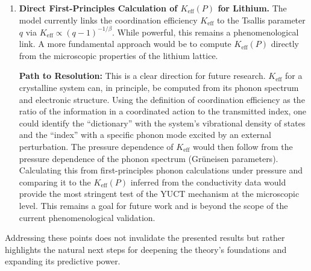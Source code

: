 \documentclass[12pt,a4paper]{article}
\theoremstyle{remark}
\newcommand{\Ke}{K_{\mathrm{eff}}}
\begin{document}
\begin{enumerate}
		\textbf{Path to Resolution:} This point can be clarified by stating that \(q(P)\) is not a free parameter of YUCT, but an input derived from the well-established physics of lithium under pressure. It is determined by the pressure-dependent electronic density of states and the resulting modification to the non-extensivity parameter. This relationship, \(q(P)\), is independently calculable using Density Functional Theory (DFT) and is therefore not a prediction of YUCT, but a boundary condition. The YUCT framework then takes this input and, via the universal law, predicts the conductivity. To make the text more rigorous, we can add the following: \textit{``The relation \(q(P)\) is obtained from first-principles DFT calculations of the electronic structure of lithium under pressure (e.g., via the pressure-dependent effective mass and Fermi surface topology), which is then used to compute the Tsallis \(q\)-parameter following the prescription in \cite{Tsallis2009}. Its specific form is not derived here, as it is a well-defined input from condensed matter physics, not an output of YUCT. The agreement between theory and experiment, as shown in Figure \ref{fig:fitted}, thus tests the YUCT scaling law using a standard, independently calculated input.''}
		
		\item \textbf{Direct First-Principles Calculation of \(\Ke(P)\) for Lithium.} The model currently links the coordination efficiency \(\Ke\) to the Tsallis parameter \(q\) via \(\Ke \propto (q-1)^{-1/\beta}\). While powerful, this remains a phenomenological link. A more fundamental approach would be to compute \(\Ke(P)\) directly from the microscopic properties of the lithium lattice.
		
		\textbf{Path to Resolution:} This is a clear direction for future research. \(\Ke\) for a crystalline system can, in principle, be computed from its phonon spectrum and electronic structure. Using the definition of coordination efficiency as the ratio of the information in a coordinated action to the transmitted index, one could identify the ``dictionary'' with the system's vibrational density of states and the ``index'' with a specific phonon mode excited by an external perturbation. The pressure dependence of \(\Ke\) would then follow from the pressure dependence of the phonon spectrum (Grüneisen parameters). Calculating this from first-principles phonon calculations under pressure and comparing it to the \(\Ke(P)\) inferred from the conductivity data would provide the most stringent test of the YUCT mechanism at the microscopic level. This remains a goal for future work and is beyond the scope of the current phenomenological validation.
	\end{enumerate}
	Addressing these points does not invalidate the presented results but rather highlights the natural next steps for deepening the theory's foundations and expanding its predictive power.
	
\end{document}
